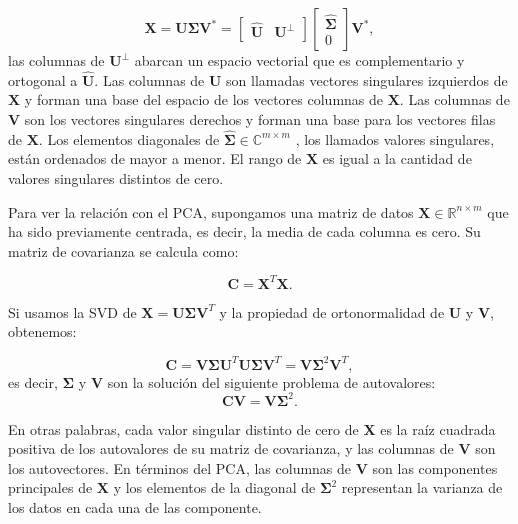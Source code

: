 \begin{equation}
	\mathbf{X} = \mathbf{U} \mathbf{\Sigma} \mathbf{V}^* = \begin{bmatrix} 	\hat{\mathbf{U}} & \mathbf{U}^\perp \end{bmatrix} \begin{bmatrix} \hat{\mathbf{\Sigma}} \\ 0 \end{bmatrix} \mathbf{V}^*,
\end{equation}
las columnas de $\mathbf{U}^\perp$ abarcan un espacio vectorial que es complementario y ortogonal a $\hat{\mathbf{U}}$. Las columnas de $\mathbf{U}$ son llamadas vectores singulares izquierdos de $\mathbf{X}$ y forman una base del espacio de los vectores columnas de $\mathbf{X}$. Las columnas de $\mathbf{V}$ son los vectores singulares derechos y forman una base para los vectores filas de $\mathbf{X}$. Los elementos diagonales de $\hat{\mathbf{\Sigma}} \in \mathbb{C}^{m \times m}$ , los llamados valores singulares, están ordenados de mayor a menor. El rango de $\mathbf{X}$ es igual a la cantidad de valores singulares distintos de cero.

Para ver la relación con el PCA, supongamos una matriz de datos $\mathbf{X} \in \mathbb{R}^{n \times m}$ que ha sido previamente centrada, es decir, la media de cada columna es cero. Su matriz de covarianza se calcula como:

\begin{equation}
	\mathbf{C} = \mathbf{X}^T  \mathbf{X}.
\end{equation}

Si usamos la SVD de $\mathbf{X} = \mathbf{U} \mathbf{\Sigma} \mathbf{V}^T$ y la propiedad de ortonormalidad de $\mathbf{U}$ y $\mathbf{V}$, obtenemos:

\begin{equation}
	\mathbf{C} = \mathbf{V} \mathbf{\Sigma} \mathbf{U}^T \mathbf{U} \mathbf{\Sigma} \mathbf{V}^T =  \mathbf{V} \mathbf{\Sigma}^2 \mathbf{V}^T,
\end{equation}
es decir, $\mathbf{\Sigma}$ y $\mathbf{V}$ son la solución del siguiente problema de autovalores:
\begin{equation}
	\mathbf{C} \mathbf{V} = \mathbf{V} \mathbf{\Sigma}^2.
\end{equation}

En otras palabras, cada valor singular distinto de cero de $\mathbf{X}$ es la raíz cuadrada positiva de los autovalores de su matriz de covarianza, y las columnas de $\mathbf{V}$ son los autovectores. En términos del PCA, las columnas de $\mathbf{V}$ son las componentes principales de $\mathbf{X}$ y los elementos de la diagonal de $\mathbf{\Sigma}^2$ representan la varianza de los datos en cada una de las componente.

